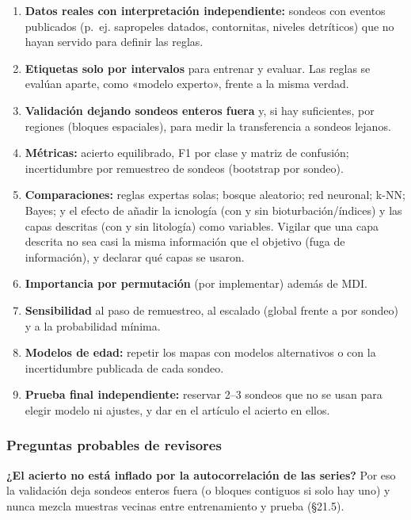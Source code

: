 \documentclass[
  10pt,
]{article}
\providecommand{\tightlist}{%
  \setlength{\itemsep}{0pt}\setlength{\parskip}{0pt}}
\begin{document}
\begin{enumerate}
\def\labelenumi{\arabic{enumi}.}
\tightlist
\item
  \textbf{Datos reales con interpretación independiente:} sondeos con
  eventos publicados (p.~ej. sapropeles datados, contornitas, niveles
  detríticos) que no hayan servido para definir las reglas.
\item
  \textbf{Etiquetas solo por intervalos} para entrenar y evaluar. Las
  reglas se evalúan aparte, como «modelo experto», frente a la misma
  verdad.
\item
  \textbf{Validación dejando sondeos enteros fuera} y, si hay
  suficientes, por regiones (bloques espaciales), para medir la
  transferencia a sondeos lejanos.
\item
  \textbf{Métricas:} acierto equilibrado, F1 por clase y matriz de
  confusión; incertidumbre por remuestreo de sondeos (bootstrap por
  sondeo).
\item
  \textbf{Comparaciones:} reglas expertas solas; bosque aleatorio; red
  neuronal; k-NN; Bayes; y el efecto de añadir la icnología (con y sin
  bioturbación/índices) y las capas descritas (con y sin litología) como
  variables. Vigilar que una capa descrita no sea casi la misma
  información que el objetivo (fuga de información), y declarar qué
  capas se usaron.
\item
  \textbf{Importancia por permutación} (por implementar) además de MDI.
\item
  \textbf{Sensibilidad} al paso de remuestreo, al escalado (global
  frente a por sondeo) y a la probabilidad mínima.
\item
  \textbf{Modelos de edad:} repetir los mapas con modelos alternativos o
  con la incertidumbre publicada de cada sondeo.
\item
  \textbf{Prueba final independiente:} reservar 2--3 sondeos que no se
  usan para elegir modelo ni ajustes, y dar en el artículo el acierto en
  ellos.
\end{enumerate}

\hypertarget{preguntas-probables-de-revisores-2}{%
\subsubsection{Preguntas probables de
revisores}\label{preguntas-probables-de-revisores-2}}

\textbf{¿El acierto no está inflado por la autocorrelación de las
series?} Por eso la validación deja sondeos enteros fuera (o bloques
contiguos si solo hay uno) y nunca mezcla muestras vecinas entre
entrenamiento y prueba (§21.5).
\end{document}
